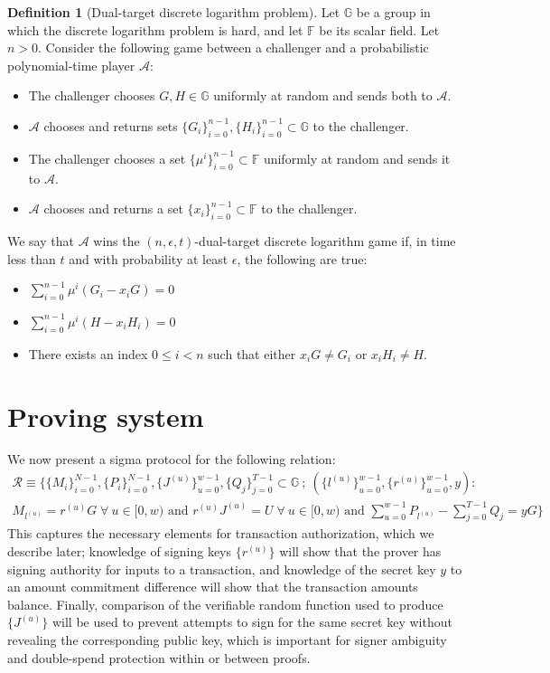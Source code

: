 \documentclass{article}
\newcommand{\G}{\mathbb{G}}
\newcommand{\F}{\mathbb{F}}
\newcommand{\A}{\mathcal{A}}
\newcommand{\sumi}{\sum_{i=0}^{n-1}}
\theoremstyle{definition}
\newtheorem{definition}{Definition}
\begin{document}
\begin{definition}[Dual-target discrete logarithm problem]
\label{def:dual}
Let $\G$ be a group in which the discrete logarithm problem is hard, and let $\F$ be its scalar field.
Let $n > 0$.
Consider the following game between a challenger and a probabilistic polynomial-time player $\A$:
\begin{itemize}
\item The challenger chooses $G,H \in \G$ uniformly at random and sends both to $\A$.
\item $\A$ chooses and returns sets $\{G_i\}_{i=0}^{n-1},\{H_i\}_{i=0}^{n-1} \subset \G$ to the challenger.
\item The challenger chooses a set $\{\mu^i\}_{i=0}^{n-1} \subset \F$ uniformly at random and sends it to $\A$.
\item $\A$ chooses and returns a set $\{x_i\}_{i=0}^{n-1} \subset \F$ to the challenger.
\end{itemize}
We say that $\A$ wins the $(n,\epsilon,t)$-dual-target discrete logarithm game if, in time less than $t$ and with probability at least $\epsilon$, the following are true:
\begin{itemize}
\item $\sumi \mu^i \left( G_i - x_iG \right) = 0$
\item $\sumi \mu^i \left( H - x_iH_i \right) = 0$
\item There exists an index $0 \leq i < n$ such that either $x_iG \neq G_i$ or $x_iH_i \neq H$.
\end{itemize}
\end{definition}


\section{Proving system}
We now present a sigma protocol for the following relation:
\begin{multline*}
\mathcal{R} \equiv \Bigg\{ \{M_i\}_{i=0}^{N-1},\{P_i\}_{i=0}^{N-1},\{J^{(u)}\}_{u=0}^{w-1},\{Q_j\}_{j=0}^{T-1} \subset \G \: ; \: \left( \{l^{(u)}\}_{u=0}^{w-1}, \{r^{(u)}\}_{u=0}^{w-1}, y \right) : \\
M_{l^{(u)}} = r^{(u)}G \; \forall \: u \in [0,w) \text{ and } r^{(u)}J^{(u)} = U \; \forall \: u \in [0,w) \text{ and } \sum_{u=0}^{w-1} P_{l^{(u)}} - \sum_{j=0}^{T-1} Q_j = yG \Bigg\}
\end{multline*}
This captures the necessary elements for transaction authorization, which we describe later; knowledge of signing keys $\{r^{(u)}\}$ will show that the prover has signing authority for inputs to a transaction, and knowledge of the secret key $y$ to an amount commitment difference will show that the transaction amounts balance.
Finally, comparison of the verifiable random function used to produce $\{J^{(u)}\}$ will be used to prevent attempts to sign for the same secret key without revealing the corresponding public key, which is important for signer ambiguity and double-spend protection within or between proofs.
\end{document}
